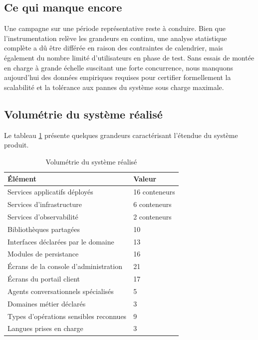 \subsection{Ce qui manque encore}

Une campagne sur une période représentative reste à conduire. Bien que l'instrumentation relève les grandeurs en continu, une analyse statistique complète a dû être différée en raison des contraintes de calendrier, mais également du nombre limité d'utilisateurs en phase de test. Sans essais de montée en charge à grande échelle suscitant une forte concurrence, nous manquons aujourd'hui des données empiriques requises pour certifier formellement la scalabilité et la tolérance aux pannes du système sous charge maximale.

\subsection{Volumétrie du système réalisé}

Le tableau \ref{tab:volumetrie} présente quelques grandeurs caractérisant l'étendue du système produit.

\begin{table}[H]
\centering
\renewcommand{\arraystretch}{1.2}
\begin{tabular}{|p{8.0cm}|p{6.5cm}|}
\hline
\textbf{Élément} & \textbf{Valeur} \\
\hline
Services applicatifs déployés & 16 conteneurs \\
\hline
Services d'infrastructure & 6 conteneurs \\
\hline
Services d'observabilité & 2 conteneurs \\
\hline
Bibliothèques partagées & 10 \\
\hline
Interfaces déclarées par le domaine & 13 \\
\hline
Modules de persistance & 16 \\
\hline
Écrans de la console d'administration & 21 \\
\hline
Écrans du portail client & 17 \\
\hline
Agents conversationnels spécialisés & 5 \\
\hline
Domaines métier déclarés & 3 \\
\hline
Types d'opérations sensibles reconnues & 9 \\
\hline
Langues prises en charge & 3 \\
\hline
\end{tabular}
\caption{Volumétrie du système réalisé}
\label{tab:volumetrie}
\end{table}

